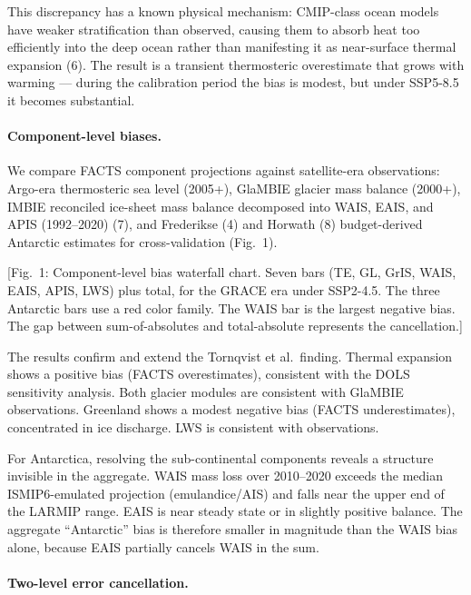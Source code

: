 \documentclass[11pt]{article}
\begin{document}
This discrepancy has a known physical mechanism: CMIP-class ocean models have weaker stratification than observed, causing them to absorb heat too efficiently into the deep ocean rather than manifesting it as near-surface thermal expansion (6).  The result is a transient thermosteric overestimate that grows with warming --- during the calibration period the bias is modest, but under SSP5-8.5 it becomes substantial.


\paragraph{Component-level biases.}

We compare FACTS component projections against satellite-era observations: Argo-era thermosteric sea level (2005+), GlaMBIE glacier mass balance (2000+), IMBIE reconciled ice-sheet mass balance decomposed into WAIS, EAIS, and APIS (1992--2020) (7), and Frederikse (4) and Horwath (8) budget-derived Antarctic estimates for cross-validation (Fig.~1).

[Fig.~1: Component-level bias waterfall chart. Seven bars (TE, GL, GrIS, WAIS, EAIS, APIS, LWS) plus total, for the GRACE era under SSP2-4.5.  The three Antarctic bars use a red color family. The WAIS bar is the largest negative bias. The gap between sum-of-absolutes and total-absolute represents the cancellation.]

The results confirm and extend the Tornqvist et al.\ finding.  Thermal expansion shows a positive bias (FACTS overestimates), consistent with the DOLS sensitivity analysis.  Both glacier modules are consistent with GlaMBIE observations.  Greenland shows a modest negative bias (FACTS underestimates), concentrated in ice discharge.  LWS is consistent with observations.

For Antarctica, resolving the sub-continental components reveals a structure invisible in the aggregate.  WAIS mass loss over 2010--2020 exceeds the median ISMIP6-emulated projection (emulandice/AIS) and falls near the upper end of the LARMIP range.  EAIS is near steady state or in slightly positive balance.  The aggregate ``Antarctic'' bias is therefore smaller in magnitude than the WAIS bias alone, because EAIS partially cancels WAIS in the sum.


\paragraph{Two-level error cancellation.}
\end{document}

